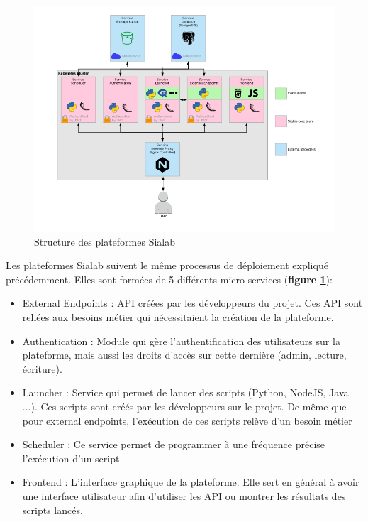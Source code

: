 \documentclass{article} %
\begin{document}
{\begin{figure}[!h]
 \centering
 \includegraphics[keepaspectratio = true,scale=0.5]{structure_sia.png}
 \caption{Structure des plateformes Sialab}
 \label{fig:strt}
\end{figure}

Les plateformes Sialab suivent le même processus de déploiement expliqué précédemment. Elles sont formées de 5 différents micro services (\textbf{figure \ref{fig:strt}}):
\begin{itemize}
 \item External Endpoints : API créées par les développeurs du projet. Ces API sont reliées aux besoins métier qui nécessitaient la création de la plateforme. 
 \item Authentication : Module qui gère l'authentification des utilisateurs sur la plateforme, mais aussi les droits d'accès sur cette dernière (admin, lecture, écriture).
 \item Launcher : Service qui permet de lancer des scripts (Python, NodeJS, Java ...). Ces scripts sont créés par les développeurs sur le projet. De même que pour external endpoints, l'exécution de ces scripts relève d'un besoin métier
 \item Scheduler : Ce service permet de programmer à une fréquence précise l'exécution d'un script.
 \item Frontend : L'interface graphique de la plateforme. Elle sert en général à avoir une interface utilisateur afin d'utiliser les API ou montrer les résultats des scripts lancés.
\end{itemize}

}
\end{document}
